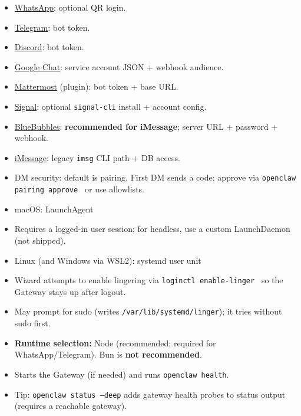 \begin{itemize}
  \item \href{/channels/whatsapp}{WhatsApp}: optional QR login.
  \item \href{/channels/telegram}{Telegram}: bot token.
  \item \href{/channels/discord}{Discord}: bot token.
  \item \href{/channels/googlechat}{Google Chat}: service account JSON + webhook audience.
  \item \href{/channels/mattermost}{Mattermost} (plugin): bot token + base URL.
  \item \href{/channels/signal}{Signal}: optional \texttt{signal-cli} install + account config.
  \item \href{/channels/bluebubbles}{BlueBubbles}: \textbf{recommended for iMessage}; server URL + password + webhook.
  \item \href{/channels/imessage}{iMessage}: legacy \texttt{imsg} CLI path + DB access.
  \item DM security: default is pairing. First DM sends a code; approve via \texttt{openclaw pairing approve  } or use allowlists.
\end{itemize}

\begin{itemize}
  \item macOS: LaunchAgent
  \item Requires a logged-in user session; for headless, use a custom LaunchDaemon (not shipped).
  \item Linux (and Windows via WSL2): systemd user unit
  \item Wizard attempts to enable lingering via \texttt{loginctl enable-linger } so the Gateway stays up after logout.
  \item May prompt for sudo (writes \texttt{/var/lib/systemd/linger}); it tries without sudo first.
  \item \textbf{Runtime selection:} Node (recommended; required for WhatsApp/Telegram). Bun is \textbf{not recommended}.
\end{itemize}

\begin{itemize}
  \item Starts the Gateway (if needed) and runs \texttt{openclaw health}.
  \item Tip: \texttt{openclaw status --deep} adds gateway health probes to status output (requires a reachable gateway).
\end{itemize}

